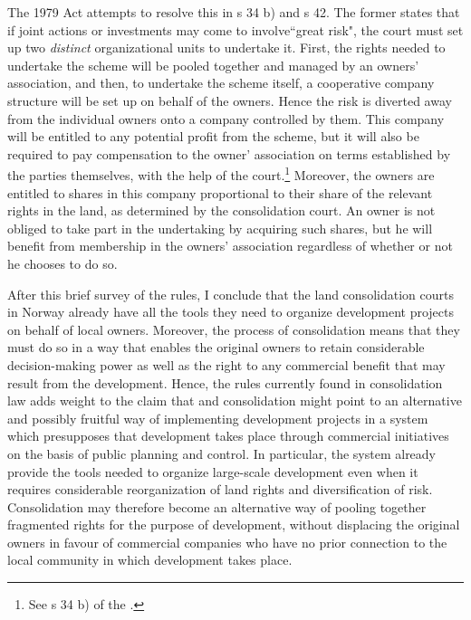 The 1979 Act attempts to resolve this in s 34 b) and s 42. The former states that if joint actions or investments may come to involve``great risk", the court must set up two \emph{distinct} organizational units to undertake it. First, the rights needed to undertake the scheme will be pooled together and managed by an owners' association, and then, to undertake the scheme itself, a cooperative company structure will be set up on behalf of the owners. Hence the risk is diverted away from the individual owners onto a company controlled by them. This company will be entitled to any potential profit from the scheme, but it will also be required to pay compensation to the owner' association on terms established by the parties themselves, with the help of the court.\footnote{See s 34 b) of the \cite{lca79}.} Moreover, the owners are entitled to shares in this company proportional to their share of the relevant rights in the land, as determined by the consolidation court. An owner is not obliged to take part in the undertaking by acquiring such shares, but he will benefit from membership in the owners' association regardless of whether or not he chooses to do so.

After this brief survey of the rules, I conclude that the land consolidation courts in Norway already have all the tools they need to organize development projects on behalf of local owners. Moreover, the process of consolidation means that they must do so in a way that enables the original owners to retain considerable decision-making power as well as the right to any commercial benefit that may result from the development. Hence, the rules currently found in consolidation law adds weight to the claim that and consolidation might point to an alternative and possibly fruitful way of implementing development projects in a system which presupposes that development takes place through commercial initiatives on the basis of public  planning and control. In particular, the system already provide the tools needed to organize large-scale development even when it requires considerable reorganization of land rights and diversification of risk. Consolidation may therefore become an alternative way of pooling together fragmented rights for the purpose of development, without displacing the original owners in favour of commercial companies who have no prior connection to the local community in which development takes place.

